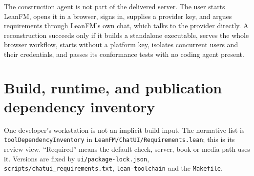 The construction agent is not part of the delivered server. The user starts
LeanFM, opens it in a browser, signs in, supplies a provider key, and argues
requirements through LeanFM's own chat, which talks to the provider directly. A
reconstruction succeeds only if it builds a standalone executable, serves the whole
browser workflow, starts without a platform key, isolates concurrent users and
their credentials, and passes its conformance tests with no coding agent present.

\section{Build, runtime, and publication dependency inventory}
\label{sec:dependency-inventory}

One developer's workstation is not an implicit build input. The normative list is
\texttt{toolDependencyInventory} in \texttt{LeanFM/ChatUI/Requirements.lean}; this
is its review view. ``Required'' means the default check, server, book or media
path uses it. Versions are fixed by \texttt{ui/package-lock.json},
\texttt{scripts/chatui\_requirements.txt}, \texttt{lean-toolchain} and the
\texttt{Makefile}.

